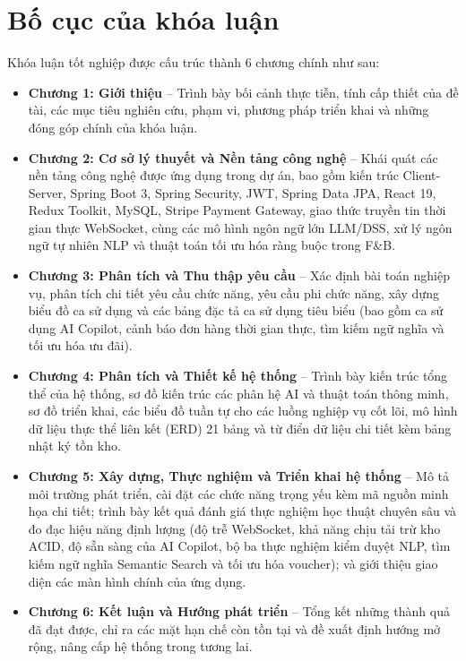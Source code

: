 \documentclass{uetgraduation}
\begin{document}
\section{Bố cục của khóa luận}
Khóa luận tốt nghiệp được cấu trúc thành 6 chương chính như sau:
\begin{itemize}
    \item \textbf{Chương 1: Giới thiệu} -- Trình bày bối cảnh thực tiễn, tính cấp thiết của đề tài, các mục tiêu nghiên cứu, phạm vi, phương pháp triển khai và những đóng góp chính của khóa luận.
    \item \textbf{Chương 2: Cơ sở lý thuyết và Nền tảng công nghệ} -- Khái quát các nền tảng công nghệ được ứng dụng trong dự án, bao gồm kiến trúc Client-Server, Spring Boot 3, Spring Security, JWT, Spring Data JPA, React 19, Redux Toolkit, MySQL, Stripe Payment Gateway, giao thức truyền tin thời gian thực WebSocket, cùng các mô hình ngôn ngữ lớn LLM/DSS, xử lý ngôn ngữ tự nhiên NLP và thuật toán tối ưu hóa ràng buộc trong F\&B.
    \item \textbf{Chương 3: Phân tích và Thu thập yêu cầu} -- Xác định bài toán nghiệp vụ, phân tích chi tiết yêu cầu chức năng, yêu cầu phi chức năng, xây dựng biểu đồ ca sử dụng và các bảng đặc tả ca sử dụng tiêu biểu (bao gồm ca sử dụng AI Copilot, cảnh báo đơn hàng thời gian thực, tìm kiếm ngữ nghĩa và tối ưu hóa ưu đãi).
    \item \textbf{Chương 4: Phân tích và Thiết kế hệ thống} -- Trình bày kiến trúc tổng thể của hệ thống, sơ đồ kiến trúc các phân hệ AI và thuật toán thông minh, sơ đồ triển khai, các biểu đồ tuần tự cho các luồng nghiệp vụ cốt lõi, mô hình dữ liệu thực thể liên kết (ERD) 21 bảng và từ điển dữ liệu chi tiết kèm bảng nhật ký tồn kho.
    \item \textbf{Chương 5: Xây dựng, Thực nghiệm và Triển khai hệ thống} -- Mô tả môi trường phát triển, cài đặt các chức năng trọng yếu kèm mã nguồn minh họa chi tiết; trình bày kết quả đánh giá thực nghiệm học thuật chuyên sâu và đo đạc hiệu năng định lượng (độ trễ WebSocket, khả năng chịu tải trừ kho ACID, độ sẵn sàng của AI Copilot, bộ ba thực nghiệm kiểm duyệt NLP, tìm kiếm ngữ nghĩa Semantic Search và tối ưu hóa voucher); và giới thiệu giao diện các màn hình chính của ứng dụng.
    \item \textbf{Chương 6: Kết luận và Hướng phát triển} -- Tổng kết những thành quả đã đạt được, chỉ ra các mặt hạn chế còn tồn tại và đề xuất định hướng mở rộng, nâng cấp hệ thống trong tương lai.
\end{itemize}
\end{document}
